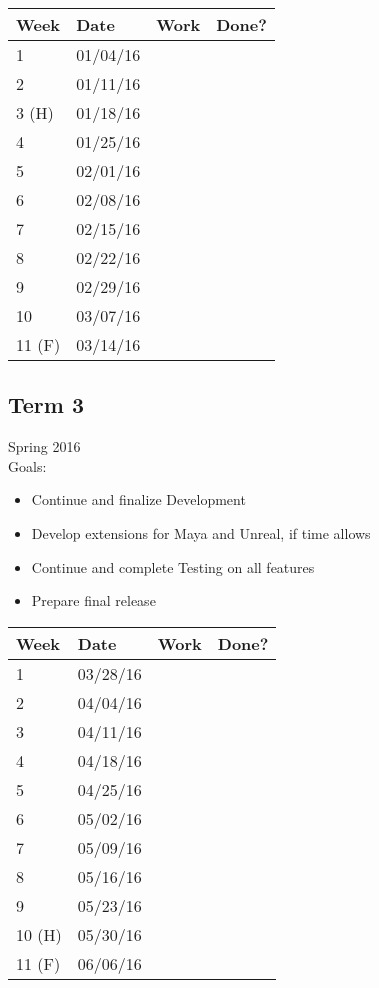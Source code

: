 \documentclass[12pt]{article}
\begin{document}
\begin{table}[H]
\centering
\begin{tabular}{|l|l|l|l|}
\hline
Week 	& Date	 		& Work	 		& 	Done?	 \\ \hline
1		& 01/04/16	 	& 		& 			 \\ \hline
2		& 01/11/16	 	& 		& 			 \\ \hline
3 (H)	& 01/18/16	 	& 		& 			 \\ \hline
4		& 01/25/16	 	& 		& 			 \\ \hline
5		& 02/01/16	 	& 		& 			 \\ \hline
6		& 02/08/16	 	& 		& 			 \\ \hline
7		& 02/15/16	 	& 		& 			 \\ \hline
8		& 02/22/16	 	& 		& 			 \\ \hline
9		& 02/29/16	 	& 		& 			 \\ \hline
10		& 03/07/16	 	& 		& 			 \\ \hline
11 (F)	& 03/14/16	 	& 		& 			 \\ \hline
\end{tabular}
\end{table}

\subsection{Term 3}
Spring 2016 \\
Goals:
\begin{itemize}
	\item Continue and finalize Development
	\item Develop extensions for Maya and Unreal, if time allows
	\item Continue and complete Testing on all features
	\item Prepare final release
\end{itemize}

\begin{table}[H]
\centering
\begin{tabular}{|l|l|l|l|}
\hline
Week 	& Date	 		& Work	 		& 	Done?	 \\ \hline
1		& 03/28/16	 	& 		& 			 \\ \hline
2		& 04/04/16	 	& 		& 			 \\ \hline
3		& 04/11/16	 	& 		& 			 \\ \hline
4		& 04/18/16	 	& 		& 			 \\ \hline
5		& 04/25/16	 	& 		& 			 \\ \hline
6		& 05/02/16	 	& 		& 			 \\ \hline
7		& 05/09/16	 	& 		& 			 \\ \hline
8		& 05/16/16	 	& 		& 			 \\ \hline
9		& 05/23/16	 	& 		& 			 \\ \hline
10 (H)	& 05/30/16	 	& 		& 			 \\ \hline
11 (F)	& 06/06/16	 	& 		& 			 \\ \hline
\end{tabular}
\end{table}
\end{document}
